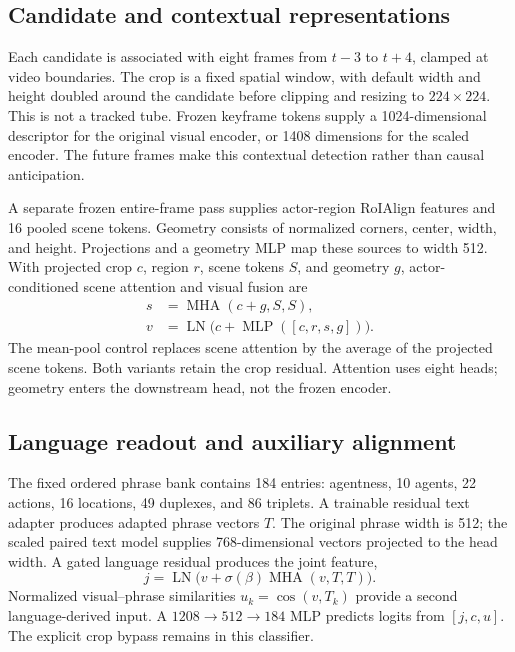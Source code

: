 \documentclass[11pt,letterpaper]{article}
\begin{document}
\subsection{Candidate and contextual representations}
Each candidate is associated with eight frames from $t-3$ to $t+4$, clamped at video boundaries. The crop is a fixed spatial window, with default width and height doubled around the candidate before clipping and resizing to $224\times224$. This is not a tracked tube. Frozen keyframe tokens supply a 1024-dimensional descriptor for the original visual encoder, or 1408 dimensions for the scaled encoder. The future frames make this contextual detection rather than causal anticipation.

A separate frozen entire-frame pass supplies actor-region RoIAlign features and 16 pooled scene tokens. Geometry consists of normalized corners, center, width, and height. Projections and a geometry MLP map these sources to width 512. With projected crop $c$, region $r$, scene tokens $S$, and geometry $g$, actor-conditioned scene attention and visual fusion are
\begin{align}
s&=\operatorname{MHA}(c+g,S,S),\\
v&=\operatorname{LN}\big(c+\operatorname{MLP}([c,r,s,g])\big).
\end{align}
The mean-pool control replaces scene attention by the average of the projected scene tokens. Both variants retain the crop residual. Attention uses eight heads; geometry enters the downstream head, not the frozen encoder.

\subsection{Language readout and auxiliary alignment}
The fixed ordered phrase bank contains 184 entries: agentness, 10 agents, 22 actions, 16 locations, 49 duplexes, and 86 triplets. A trainable residual text adapter produces adapted phrase vectors $T$. The original phrase width is 512; the scaled paired text model supplies 768-dimensional vectors projected to the head width. A gated language residual produces the joint feature,
\begin{equation}
j=\operatorname{LN}\big(v+\sigma(\beta)\operatorname{MHA}(v,T,T)\big).
\end{equation}
Normalized visual--phrase similarities $u_k=\cos(v,T_k)$ provide a second language-derived input. A $1208\rightarrow512\rightarrow184$ MLP predicts logits from $[j,c,u]$. The explicit crop bypass remains in this classifier.
\end{document}
